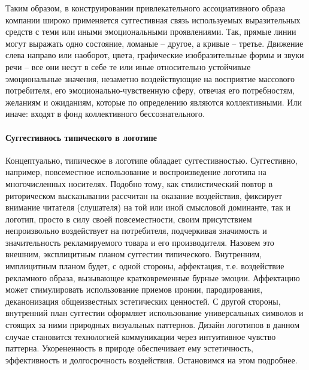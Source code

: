 Таким образом, в конструировании привлекательного ассоциативного образа компании
широко применяется суггестивная связь используемых выразительных средств с теми
или иными эмоциональными проявлениями. Так, прямые линии  могут выражать одно
состояние, ломаные -- другое, а кривые -- третье. Движение слева направо или
наоборот,  цвета, графические изобразительные формы и звуки речи -- все они
несут в себе те или иные относительно устойчивые эмоциональные значения,
незаметно воздействующие на восприятие массового потребителя, его
эмоционально-чувственную сферу, отвечая его потребностям, желаниям и ожиданиям,
которые по определению являются коллективными. Или иначе: входят в фонд
коллективного бессознательного.

\paragraph{Суггестивнось типического в логотипе}
Концептуально, типическое в логотипе обладает суггестивностью. Суггестивно,
например, повсеместное использование и воспроизведение логотипа на
многочисленных носителях. Подобно тому, как стилистический повтор в риторическом
высказывании рассчитан на оказание воздействия, фиксирует внимание
читателя (слушателя) на той или иной смысловой доминанте, так и логотип,
просто в силу своей повсеместности, своим присутствием непроизвольно
воздействует на потребителя, подчеркивая значимость и значительность
рекламируемого товара и его производителя. Назовем это внешним, эксплицитным
планом суггестии типического. Внутренним, имплицитным планом будет, с одной
стороны, аффектация, т.е. воздействие рекламного образа, вызывающее
кратковременные бурные эмоции. Аффектацию может стимулировать использование
приемов иронии, пародирования, деканонизация общеизвестных эстетических
ценностей. С другой стороны, внутренний план суггестии оформляет  использование
универсальных символов и стоящих за ними природных визуальных паттернов.
Дизайн логотипов в данном случае становится технологией коммуникации через
интуитивное чувство паттерна. Укорененность в природе обеспечивает ему
эстетичность, эффективность и долгосрочность воздействия.\autocite[][9]{macnab2008decoding} Остановимся
на этом подробнее.


